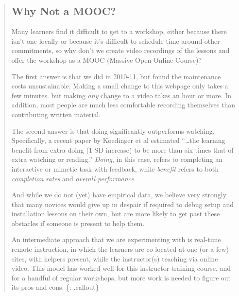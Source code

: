 \begin{quote}
\subsection{Why Not a MOOC?}\label{why-not-a-mooc}

Many learners find it difficult to get to a workshop, either because
there isn't one locally or because it's difficult to schedule time
around other commitments, so why don't we create video recordings of the
lessons and offer the workshop as a MOOC (Massive Open Online Course)?

The first answer is that we did in 2010-11, but found the maintenance
costs unsustainable. Making a small change to this webpage only takes a
few minutes. but making \emph{any} change to a video takes an hour or
more. In addition, most people are much less comfortable recording
themselves than contributing written material.

The second answer is that doing significantly outperforms watching.
Specifically, a
recent paper by Koedinger et al \cite{bib:koedinger-doing-watching}
estimated ``\ldots{}the learning benefit from
extra doing (1 SD increase) to be more than six times that of extra
watching or reading.'' \emph{Doing}, in this case, refers to completing
an interactive or mimetic task with feedback, while \emph{benefit}
refers to both \emph{completion rates} and \emph{overall performance}.

And while we do not (yet) have empirical data, we believe very strongly
that many novices would give up in despair if required to debug setup
and installation lessons on their own, but are more likely to get past
these obstacles if someone is present to help them.

An intermediate approach that we are experimenting with is real-time
remote instruction, in which the learners are co-located at one (or a
few) sites, with helpers present, while the instructor(s) teaching via
online video. This model has worked well for this instructor training
course, and for a handful of regular workshops, but more work is needed
to figure out its pros and cons. \{: .callout\}
\end{quote}
